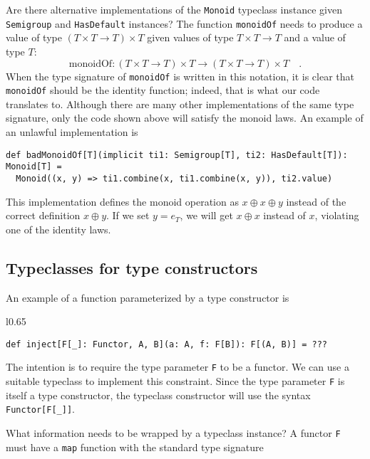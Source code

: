 Are there alternative implementations of the \lstinline!Monoid! typeclass
instance given \lstinline!Semigroup! and \lstinline!HasDefault!
instances? The function \lstinline!monoidOf! needs to produce a value
of type $\left(T\times T\rightarrow T\right)\times T$ given values
of type $T\times T\rightarrow T$ and a value of type $T$:
\[
\text{monoidOf}:\left(T\times T\rightarrow T\right)\times T\rightarrow\left(T\times T\rightarrow T\right)\times T\quad.
\]
When the type signature of \lstinline!monoidOf! is written in this
notation, it is clear that \lstinline!monoidOf! should be the identity
function; indeed, that is what our code translates to. Although there
are many other implementations of the same type signature, only the
code shown above will satisfy the monoid laws. An example of an unlawful
implementation is
\begin{lstlisting}
def badMonoidOf[T](implicit ti1: Semigroup[T], ti2: HasDefault[T]): Monoid[T] =
  Monoid((x, y) => ti1.combine(x, ti1.combine(x, y)), ti2.value)
\end{lstlisting}
This implementation defines the monoid operation as $x\oplus x\oplus y$
instead of the correct definition $x\oplus y$. If we set $y=e_{T}$,
we will get $x\oplus x$ instead of $x$, violating one of the identity
laws.

\subsection{Typeclasses for type constructors\label{subsec:Typeclasses-for-type-constructors}}

An example of a function parameterized by a type constructor is

\begin{wrapfigure}{l}{0.65\columnwidth}%
\vspace{-0.85\baselineskip}
\begin{lstlisting}
def inject[F[_]: Functor, A, B](a: A, f: F[B]): F[(A, B)] = ???
\end{lstlisting}
\vspace{-0.85\baselineskip}
\end{wrapfigure}%

\noindent The intention is to require the type parameter \lstinline!F!
to be a functor. We can use a suitable typeclass to implement this
constraint. Since the type parameter \lstinline!F! is itself a type
constructor, the typeclass constructor will use the syntax \lstinline!Functor[F[_]]!. 

What information needs to be wrapped by a typeclass instance? A functor
\lstinline!F! must have a \lstinline!map! function with the standard
type signature

